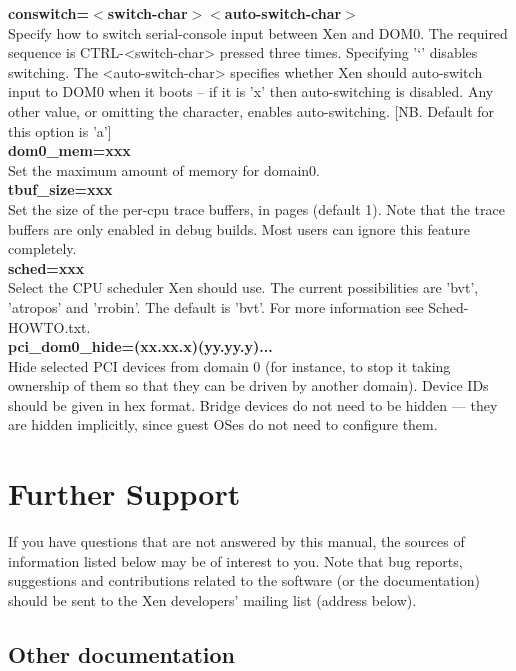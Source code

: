 \documentclass[11pt,twoside,final,openright]{xenstyle}
\begin{document}
{\bf conswitch=$<$switch-char$><$auto-switch-char$>$ } \\
 Specify how to switch serial-console input between
 Xen and DOM0. The required sequence is CTRL-<switch-char>
 pressed three times. Specifying '`' disables switching.
 The <auto-switch-char> specifies whether Xen should
 auto-switch input to DOM0 when it boots -- if it is 'x'
 then auto-switching is disabled. Any other value, or
 omitting the character, enables auto-switching.
 [NB. Default for this option is 'a'] \\

{\bf dom0\_mem=xxx } \\
 Set the maximum amount of memory for domain0. \\

{\bf tbuf\_size=xxx } \\
 Set the size of the per-cpu trace buffers, in pages
 (default 1).  Note that the trace buffers are only
 enabled in debug builds.  Most users can ignore
 this feature completely. \\

{\bf sched=xxx } \\
 Select the CPU scheduler Xen should use.  The current
 possibilities are 'bvt', 'atropos' and 'rrobin'.  The
 default is 'bvt'.  For more information see
 Sched-HOWTO.txt. \\

{\bf pci\_dom0\_hide=(xx.xx.x)(yy.yy.y)... } \\
Hide selected PCI devices from domain 0 (for instance, to stop it
taking ownership of them so that they can be driven by another
domain).  Device IDs should be given in hex format.  Bridge devices do
not need to be hidden --- they are hidden implicitly, since guest OSes
do not need to configure them.

\chapter{Further Support}

If you have questions that are not answered by this manual, the
sources of information listed below may be of interest to you.  Note
that bug reports, suggestions and contributions related to the
software (or the documentation) should be sent to the Xen developers'
mailing list (address below).

\section{Other documentation}
\end{document}
